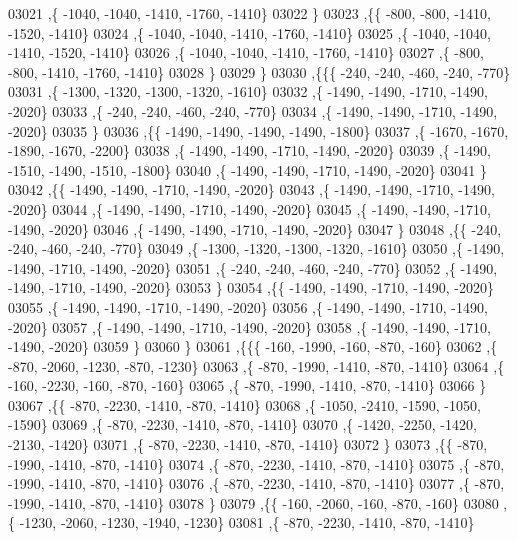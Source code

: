 \begin{DoxyCode}
03021     ,\{ -1040, -1040, -1410, -1760, -1410\}
03022     \}
03023    ,\{\{  -800,  -800, -1410, -1520, -1410\}
03024     ,\{ -1040, -1040, -1410, -1760, -1410\}
03025     ,\{ -1040, -1040, -1410, -1520, -1410\}
03026     ,\{ -1040, -1040, -1410, -1760, -1410\}
03027     ,\{  -800,  -800, -1410, -1760, -1410\}
03028     \}
03029    \}
03030   ,\{\{\{  -240,  -240,  -460,  -240,  -770\}
03031     ,\{ -1300, -1320, -1300, -1320, -1610\}
03032     ,\{ -1490, -1490, -1710, -1490, -2020\}
03033     ,\{  -240,  -240,  -460,  -240,  -770\}
03034     ,\{ -1490, -1490, -1710, -1490, -2020\}
03035     \}
03036    ,\{\{ -1490, -1490, -1490, -1490, -1800\}
03037     ,\{ -1670, -1670, -1890, -1670, -2200\}
03038     ,\{ -1490, -1490, -1710, -1490, -2020\}
03039     ,\{ -1490, -1510, -1490, -1510, -1800\}
03040     ,\{ -1490, -1490, -1710, -1490, -2020\}
03041     \}
03042    ,\{\{ -1490, -1490, -1710, -1490, -2020\}
03043     ,\{ -1490, -1490, -1710, -1490, -2020\}
03044     ,\{ -1490, -1490, -1710, -1490, -2020\}
03045     ,\{ -1490, -1490, -1710, -1490, -2020\}
03046     ,\{ -1490, -1490, -1710, -1490, -2020\}
03047     \}
03048    ,\{\{  -240,  -240,  -460,  -240,  -770\}
03049     ,\{ -1300, -1320, -1300, -1320, -1610\}
03050     ,\{ -1490, -1490, -1710, -1490, -2020\}
03051     ,\{  -240,  -240,  -460,  -240,  -770\}
03052     ,\{ -1490, -1490, -1710, -1490, -2020\}
03053     \}
03054    ,\{\{ -1490, -1490, -1710, -1490, -2020\}
03055     ,\{ -1490, -1490, -1710, -1490, -2020\}
03056     ,\{ -1490, -1490, -1710, -1490, -2020\}
03057     ,\{ -1490, -1490, -1710, -1490, -2020\}
03058     ,\{ -1490, -1490, -1710, -1490, -2020\}
03059     \}
03060    \}
03061   ,\{\{\{  -160, -1990,  -160,  -870,  -160\}
03062     ,\{  -870, -2060, -1230,  -870, -1230\}
03063     ,\{  -870, -1990, -1410,  -870, -1410\}
03064     ,\{  -160, -2230,  -160,  -870,  -160\}
03065     ,\{  -870, -1990, -1410,  -870, -1410\}
03066     \}
03067    ,\{\{  -870, -2230, -1410,  -870, -1410\}
03068     ,\{ -1050, -2410, -1590, -1050, -1590\}
03069     ,\{  -870, -2230, -1410,  -870, -1410\}
03070     ,\{ -1420, -2250, -1420, -2130, -1420\}
03071     ,\{  -870, -2230, -1410,  -870, -1410\}
03072     \}
03073    ,\{\{  -870, -1990, -1410,  -870, -1410\}
03074     ,\{  -870, -2230, -1410,  -870, -1410\}
03075     ,\{  -870, -1990, -1410,  -870, -1410\}
03076     ,\{  -870, -2230, -1410,  -870, -1410\}
03077     ,\{  -870, -1990, -1410,  -870, -1410\}
03078     \}
03079    ,\{\{  -160, -2060,  -160,  -870,  -160\}
03080     ,\{ -1230, -2060, -1230, -1940, -1230\}
03081     ,\{  -870, -2230, -1410,  -870, -1410\}

\end{DoxyCode}
